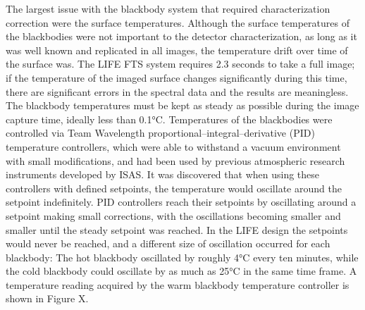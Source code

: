 The largest issue with the blackbody system that required characterization correction were the surface temperatures. Although the surface temperatures of the blackbodies were not important to the detector characterization, as long as it was well known and replicated in all images, the temperature drift over time of the surface was. The LIFE FTS system requires 2.3 seconds to take a full image; if the temperature of the imaged surface changes significantly during this time, there are significant errors in the spectral data and the results are meaningless. The blackbody temperatures must be kept as steady as possible during the image capture time, ideally less than 0.1°C. Temperatures of the blackbodies were controlled via Team Wavelength proportional–integral–derivative (PID) temperature controllers, which were able to withstand a vacuum environment with small modifications, and had been used by previous atmospheric research instruments developed by ISAS. It was discovered that when using these controllers with defined setpoints, the temperature would oscillate around the setpoint indefinitely. PID controllers reach their setpoints by oscillating around a setpoint making small corrections, with the oscillations becoming smaller and smaller until the steady setpoint was reached. In the LIFE design the setpoints would never be reached, and a different size of oscillation occurred for each blackbody: The hot blackbody oscillated by roughly 4°C every ten minutes, while the cold blackbody could oscillate by as much as 25°C in the same time frame. A temperature reading acquired by the warm blackbody temperature controller is shown in Figure X.


